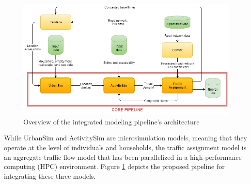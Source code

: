 \begin{figure}[htbp]
  \center
  \includegraphics[width=\textwidth]
  {graphics/diagram_pipeline.png}
  \caption{Overview of the integrated modeling pipeline's architecture}
  \label{fig:overview_pipeline_architecture}
\end{figure}

While UrbanSim and ActivitySim are microsimulation models, meaning that they operate at the level of individuals and households, the traffic assignment model is an aggregate traffic flow model that has been parallelized in a high-performance computing (HPC) environment. Figure \ref{fig:overview_pipeline_architecture} depicts the proposed pipeline for integrating these three models.
